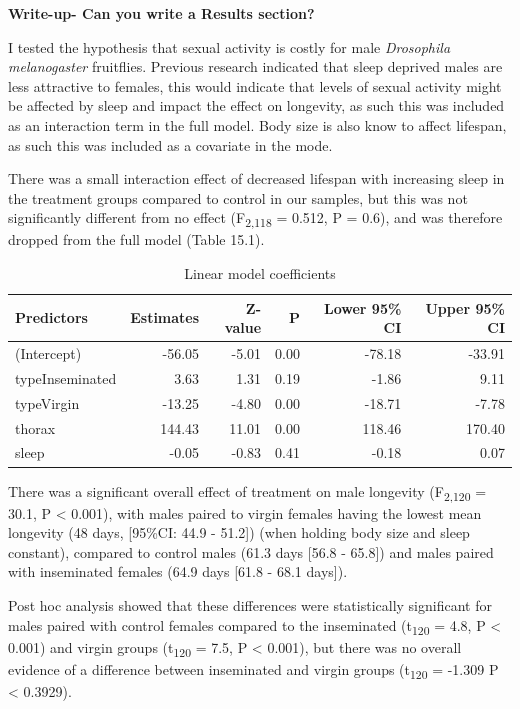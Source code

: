 \documentclass[
]{book}
\begin{document}
\textbf{Write-up- Can you write a Results section?}

I tested the hypothesis that sexual activity is costly for male \emph{Drosophila melanogaster} fruitflies. Previous research indicated that sleep deprived males are less attractive to females, this would indicate that levels of sexual activity might be affected by sleep and impact the effect on longevity, as such this was included as an interaction term in the full model. Body size is also know to affect lifespan, as such this was included as a covariate in the mode.

There was a small interaction effect of decreased lifespan with increasing sleep in the treatment groups compared to control in our samples, but this was not significantly different from no effect (F\textsubscript{2,118} = 0.512, P = 0.6), and was therefore dropped from the full model (Table 15.1).

\begin{table}

\caption{\label{tab:unnamed-chunk-527}Linear model coefficients}
\centering
\fontsize{16}{18}\selectfont
\begin{tabular}[t]{lrrrrr}
\toprule
Predictors & Estimates & Z-value & P & Lower 95\% CI & Upper 95\% CI\\
\midrule
(Intercept) & -56.05 & -5.01 & 0.00 & -78.18 & -33.91\\
typeInseminated & 3.63 & 1.31 & 0.19 & -1.86 & 9.11\\
typeVirgin & -13.25 & -4.80 & 0.00 & -18.71 & -7.78\\
thorax & 144.43 & 11.01 & 0.00 & 118.46 & 170.40\\
sleep & -0.05 & -0.83 & 0.41 & -0.18 & 0.07\\
\bottomrule
\end{tabular}
\end{table}

There was a significant overall effect of treatment on male longevity (F\textsubscript{2,120} = 30.1, P \textless{} 0.001), with males paired to virgin females having the lowest mean longevity (48 days, {[}95\%CI: 44.9 - 51.2{]}) (when holding body size and sleep constant), compared to control males (61.3 days {[}56.8 - 65.8{]}) and males paired with inseminated females (64.9 days {[}61.8 - 68.1 days{]}).

Post hoc analysis showed that these differences were statistically significant for males paired with control females compared to the inseminated (t\textsubscript{120} = 4.8, P \textless{} 0.001) and virgin groups (t\textsubscript{120} = 7.5, P \textless{} 0.001), but there was no overall evidence of a difference between inseminated and virgin groups (t\textsubscript{120} = -1.309 P \textless{} 0.3929).
\end{document}
